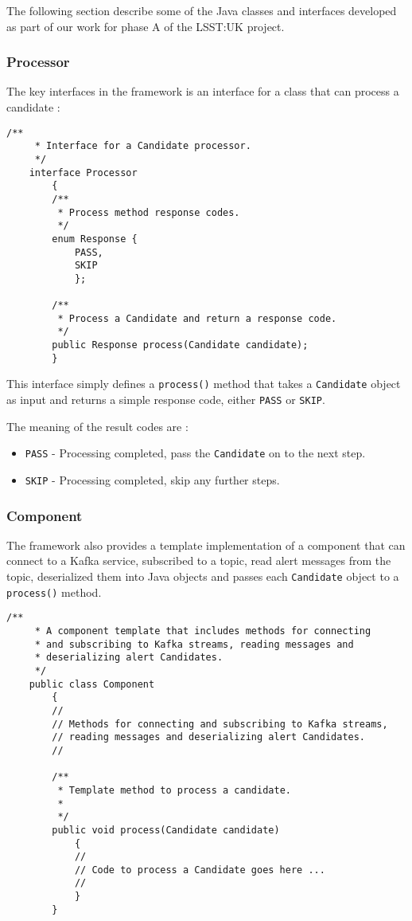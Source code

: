 \documentclass{article}
\newcommand{\phasea} {phase A\xspace}
\newcommand{\lsstuk} {LSST:UK\xspace}
\begin{document}
The following section describe some of the Java classes and interfaces developed as part of our work for \phasea of the \lsstuk project. 

\subsubsection{Processor}
\label{java-interfaces.Processor}

The key interfaces in the framework is an interface for a class that can process a candidate :

\begin{lstlisting}[style=Java]
    /**
     * Interface for a Candidate processor.
     */
    interface Processor
        {
        /**
         * Process method response codes.
         */
        enum Response {
            PASS,
            SKIP
            };

        /**
         * Process a Candidate and return a response code.
         */
        public Response process(Candidate candidate);
        }
\end{lstlisting}

This interface simply defines a \texttt{process()} method that takes a \texttt{Candidate} object as input and
returns a simple response code, either \texttt{PASS} or \texttt{SKIP}.

The meaning of the result codes are :
\begin{itemize}
  \item \texttt{PASS} - Processing completed, pass the \texttt{Candidate} on to the next step.
  \item \texttt{SKIP} - Processing completed, skip any further steps.
\end{itemize}

\subsubsection{Component}
\label{java-interfaces.Component}

The framework also provides a template implementation of a component that can connect to a Kafka service, subscribed to a topic, read alert messages from the topic, deserialized them into Java objects and passes each \texttt{Candidate} object to a \texttt{process()} method.

\begin{lstlisting}[style=Java]
    /**
     * A component template that includes methods for connecting
     * and subscribing to Kafka streams, reading messages and
     * deserializing alert Candidates.
     */
    public class Component
        {
        //
        // Methods for connecting and subscribing to Kafka streams,
        // reading messages and deserializing alert Candidates.
        //

        /**
         * Template method to process a candidate.
         *
         */
        public void process(Candidate candidate)
            {
            //
            // Code to process a Candidate goes here ...
            //
            }
        }
\end{lstlisting}
\end{document}
